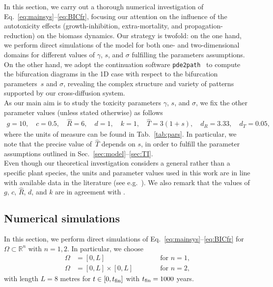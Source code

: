 \documentclass[11pt]{elsarticle}
\theoremstyle{plain}
\theoremstyle{definition}
\theoremstyle{myremark}
\begin{document}
In this section, we carry out a thorough numerical investigation of Eq.~\eqref{eq:mainsys}--\eqref{eq:BICfr}, focusing our attention on the influence of the autotoxicity effects (growth-inhibition, extra-mortality, and propagation-reduction) on the biomass dynamics. Our strategy is twofold: on the one hand, we perform direct simulations of the model for both one- and two-dimensional domains for different values of $\gamma$, $s$, and $\sigma$ fulfilling the parameters assumptions. On the other hand, we adopt the continuation software \texttt{pde2path}~\cite{pde2path} to compute the bifurcation diagrams in the 1D case with respect to the bifurcation parameters~$s$ and $\sigma$, revealing the complex structure and variety of patterns supported by our cross-diffusion system.\\
As our main aim is to study the toxicity parameters $\gamma$, $s$, and $\sigma$, we fix the other parameter values (unless stated otherwise) as follows
\begin{equation} \label{eq:parval}
\begin{gathered}
 g = 10, \quad c = 0.5, \quad \hat{R} = 6, \quad d = 1, \quad k = 1, \quad \hat{T} = 3(1+s), \quad d_R = 3.33, \quad d_T= 0.05,
\end{gathered}
\end{equation}
where the units of measure can be found in Tab.~\ref{tab:pars}.
In particular, we note that the precise value of~$\hat{T}$ depends on $s$, in order to fulfill the parameter assumptions outlined in Sec.~\ref{sec:model}--\ref{sec:TI}. \\
Even though our theoretical investigation considers a general rather than a specific plant species, the units and parameter values used in this work are in line with available data in the literature (see e.g.~\cite{De_Baets_2007,martinez1998belowground}). We also remark that the values of $g$, $c$, $\hat{R}$, $d$, and $k$ are in agreement with \cite{Carteni_2012}. 

\subsection{Numerical simulations}

In this section, we perform direct simulations of Eq.~\eqref{eq:mainsys}--\eqref{eq:BICfr} for $\Omega \subset \mathbb{R}^n$ with $n=1,2$. In particular, we choose
\begin{equation}
\begin{aligned}
    \Omega &= [0,L] \qquad &&\text{ for } n=1, \\
    \Omega &= [0,L] \times [0,L]  \qquad &&\text{ for } n=2,
\end{aligned}
\end{equation}
with length $L=8$ metres for $t \in [0, t_{\rm fin}]$ with $t_{\rm fin}=1000$ years. 
\end{document}
